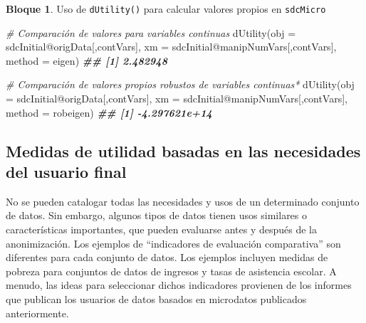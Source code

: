 \documentclass[
]{book}
\newenvironment{Shaded}{\begin{snugshade}}{\end{snugshade}}
\newcommand{\AttributeTok}[1]{\textcolor[rgb]{0.77,0.63,0.00}{#1}}
\newcommand{\CommentTok}[1]{\textcolor[rgb]{0.56,0.35,0.01}{\textit{#1}}}
\newcommand{\DocumentationTok}[1]{\textcolor[rgb]{0.56,0.35,0.01}{\textbf{\textit{#1}}}}
\newcommand{\FunctionTok}[1]{\textcolor[rgb]{0.00,0.00,0.00}{#1}}
\newcommand{\NormalTok}[1]{#1}
\newcommand{\SpecialCharTok}[1]{\textcolor[rgb]{0.00,0.00,0.00}{#1}}
\newcommand{\StringTok}[1]{\textcolor[rgb]{0.31,0.60,0.02}{#1}}
\theoremstyle{definition}
\theoremstyle{definition}
\newtheorem{example}{Bloque}[chapter]
\theoremstyle{definition}
\theoremstyle{definition}
\theoremstyle{remark}
\begin{document}
\begin{example}
\protect\hypertarget{exm:bloque8lbn}{}\label{exm:bloque8lbn}Uso de \texttt{dUtility()} para calcular valores propios en \texttt{sdcMicro}
\end{example}

\begin{Shaded}
\begin{Highlighting}[]
\CommentTok{\# Comparación de valores para variables continuas}
\FunctionTok{dUtility}\NormalTok{(}\AttributeTok{obj =}\NormalTok{ sdcInitial}\SpecialCharTok{@}\NormalTok{origData[,contVars],}
         \AttributeTok{xm =}\NormalTok{ sdcInitial}\SpecialCharTok{@}\NormalTok{manipNumVars[,contVars], }\AttributeTok{method =} \StringTok{\textquotesingle{}eigen\textquotesingle{}}\NormalTok{)}
\DocumentationTok{\#\# [1] 2.482948}

\CommentTok{\# Comparación de valores propios robustos de variables continuas*}
\FunctionTok{dUtility}\NormalTok{(}\AttributeTok{obj =}\NormalTok{ sdcInitial}\SpecialCharTok{@}\NormalTok{origData[,contVars],}
         \AttributeTok{xm =}\NormalTok{ sdcInitial}\SpecialCharTok{@}\NormalTok{manipNumVars[,contVars], }\AttributeTok{method =} \StringTok{\textquotesingle{}robeigen\textquotesingle{}}\NormalTok{)}
\DocumentationTok{\#\# [1] {-}4.297621e+14}
\end{Highlighting}
\end{Shaded}

\hypertarget{medidas-de-utilidad-basadas-en-las-necesidades-del-usuario-final}{%
\subsection{Medidas de utilidad basadas en las necesidades del usuario final}\label{medidas-de-utilidad-basadas-en-las-necesidades-del-usuario-final}}

No se pueden catalogar todas las necesidades y usos de un determinado conjunto de datos. Sin embargo, algunos tipos de datos tienen usos similares o características importantes, que pueden evaluarse antes y después de la anonimización. Los ejemplos de ``indicadores de evaluación comparativa'' \citep{templ2014} son diferentes para cada conjunto de datos. Los ejemplos incluyen medidas de pobreza para conjuntos de datos de ingresos y tasas de asistencia escolar. A menudo, las ideas para seleccionar dichos indicadores provienen de los informes que publican
los usuarios de datos basados en microdatos publicados anteriormente.
\end{document}

